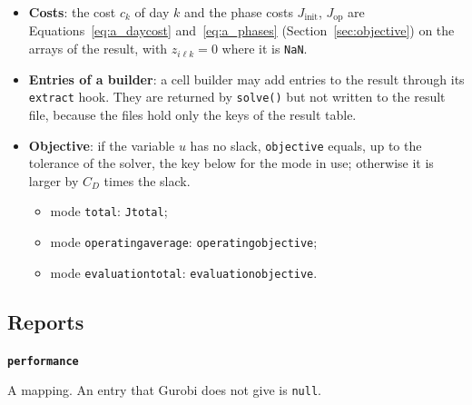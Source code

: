 \documentclass[11pt,a4paper]{article}
\theoremstyle{plain}
\theoremstyle{definition}
\newcommand{\blockhead}[1]{\par\noindent\textbf{#1}\par\nobreak}
\renewcommand{\_}{\textunderscore\allowbreak{}}
\begin{document}
\begin{itemize}[nosep,leftmargin=1.5em]
\begin{equation}
    \qquad
    u = \max_{i,k} \sum_{\ell=1}^{L} \mu_{i\ell k}^2 \quad (\texttt{quadratic}).
  \end{equation}
  \item \textbf{Costs}: the cost $c_k$ of day $k$ and the phase costs $J_{\mathrm{init}}$, $J_{\mathrm{op}}$ are Equations~\eqref{eq:a_daycost} and~\eqref{eq:a_phases} (Section~\ref{sec:objective}) on the arrays of the result, with $z_{i\ell k} = 0$ where it is \texttt{NaN}.
  \item \textbf{Entries of a builder}: a cell builder may add entries to the result through its \texttt{extract} hook. They are returned by \texttt{solve()} but not written to the result file, because the files hold only the keys of the result table.
  \item \textbf{Objective}: if the variable $u$ has no slack, \texttt{objective} equals, up to the tolerance of the solver, the key below for the mode in use; otherwise it is larger by $C_D$ times the slack.
  \begin{itemize}[nosep,leftmargin=1.5em]
    \item mode \texttt{total}: \texttt{J\_total};
    \item mode \texttt{operating\_average}: \texttt{operating\_objective};
    \item mode \texttt{evaluation\_total}: \texttt{evaluation\_objective}.
  \end{itemize}
\end{itemize}

\subsection{Reports}\label{sec:output_reports}

\blockhead{\texttt{performance}}
A mapping. An entry that Gurobi does not give is \texttt{null}.
\end{document}
